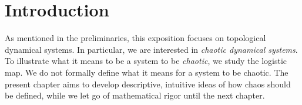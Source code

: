 \documentclass[10pt,twoside,draft]{book}
\begin{document}
\chapter{Introduction}
\label{chap:intro}
As mentioned in the preliminaries, this exposition focuses on topological dynamical systems.
In particular, we are interested in \textit{chaotic dynamical systems}.
To illustrate what it means to be a system to be \textit{chaotic}, we study the logistic map.
We do not formally define what it means for a system to be chaotic.
The present chapter aims to develop descriptive, intuitive ideas of how chaos should be defined, while we let go of mathematical rigor until the next chapter.

\end{document}
